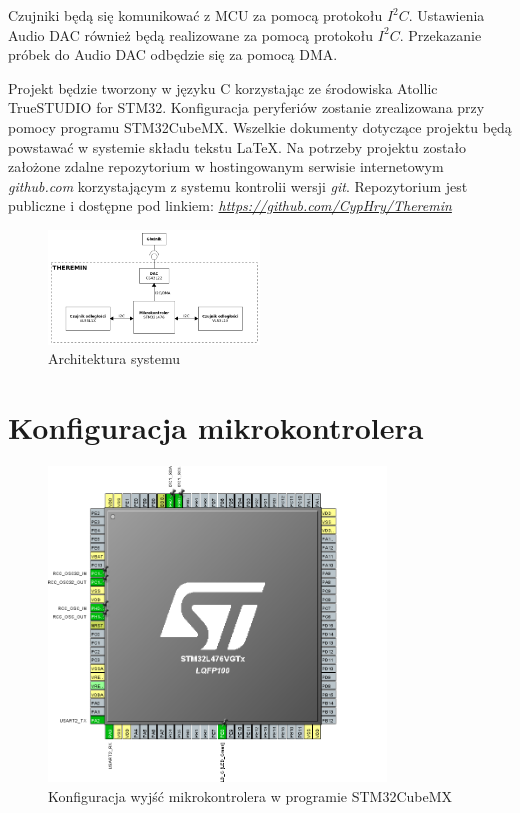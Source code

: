 \documentclass[10pt, a4paper]{article}
\begin{document}
Czujniki będą się komunikować z MCU za pomocą protokołu $I^2C$. Ustawienia Audio DAC również będą realizowane za pomocą protokołu $I^2C$. Przekazanie próbek do Audio DAC odbędzie się za pomocą DMA.


Projekt będzie tworzony w języku C korzystając ze środowiska Atollic TrueSTUDIO for STM32. Konfiguracja peryferiów zostanie zrealizowana przy pomocy programu STM32CubeMX. Wszelkie dokumenty dotyczące projektu będą powstawać w systemie składu tekstu \LaTeX. Na potrzeby projektu zostało założone zdalne repozytorium w hostingowanym serwisie internetowym \textit{github.com} korzystającym z systemu kontrolii wersji \textit{git}. Repozytorium jest publiczne i dostępne pod linkiem: \href{https://github.com/CypHry/Theremin}{\textit{https://github.com/CypHry/Theremin}}
\begin{figure}[H]
	\centering
	\includegraphics[width=0.5\textwidth]{architektura.png}
	\caption{Architektura systemu}
	\label{fig:Architektura}
\end{figure}



 
\section{Konfiguracja mikrokontrolera}

\begin{figure}[H]
	\centering
	\includegraphics[width=0.8\textwidth]{konfiguracja_mcu.png}
	\caption{Konfiguracja wyjść mikrokontrolera w programie STM32CubeMX}
	\label{fig:KonfiguracjaMikrokontrolera}
\end{figure}
\end{document}
